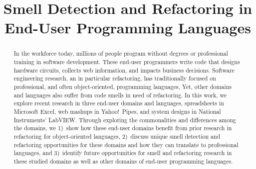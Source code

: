 \documentclass[10pt,conference,compsocconf]{IEEEtran}
\begin{document}
%
\title{Smell Detection and Refactoring in End-User Programming Languages}

\author{


\and
{}
}

\maketitle


\begin{abstract}
In the workforce today, millions of people program without degrees or professional training in software development. 
These end-user programmers write code that designs hardware circuits, collects web information, and impacts business decisions. 
Software engineering research, an in particular refactoring, has traditionally focused on professional, and often object-oriented, programming languages, 
Yet, other domains and languages also suffer from code smells in need of refactoring. 
In this work, we explore recent research in three end-user domains and languages, spreadsheets in Microsoft Excel, web mashups in Yahoo!\ Pipes, and system designs in National Instruments' LabVIEW. 
Through exploring the commonalities and differences among the domains, we 1)~show how these end-user domains benefit from prior research in refactoring for object-oriented languages, 2)~discuss unique smell detection and refactoring opportunities for these domains and how they can translate to professional languages, and 3)~identify future opportunities for smell and refactoring research in these studied domains as well as other domains of end-user programming languages. 
\end{abstract}
\end{document}
